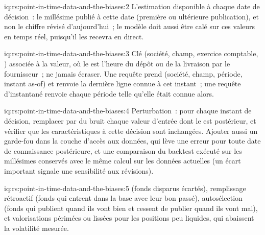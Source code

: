 \begin{solution}{iq:rs:point-in-time-data-and-the-biases:2}
L'estimation disponible à chaque date de décision~: le millésime publié à cette date (première ou ultérieure publication), et non le chiffre révisé
d'aujourd'hui~; le modèle doit aussi être calé sur ces valeurs en temps réel, puisqu'il les recevra en direct.
\end{solution}

\begin{solution}{iq:rs:point-in-time-data-and-the-biases:3}
Clé (société, champ, exercice comptable, ) associée à la valeur, où le  est l'heure du dépôt ou de la livraison par le fournisseur~;
ne jamais écraser. Une requête prend (société, champ, période, instant as-of) et renvoie la dernière ligne connue à cet instant~; une requête
d'instantané renvoie chaque période telle qu'elle était connue alors.
\end{solution}

\begin{solution}{iq:rs:point-in-time-data-and-the-biases:4}
Perturbation~: pour chaque instant de décision, remplacer par du bruit chaque valeur d'entrée dont le  est postérieur, et vérifier que les
caractéristiques à cette décision sont inchangées. Ajouter aussi un garde-fou dans la couche d'accès aux données, qui lève une erreur pour toute date de connaissance postérieure, et
une comparaison du backtest exécuté sur les millésimes conservés avec le même calcul sur les données actuelles (un écart important signale une sensibilité aux
révisions).
\end{solution}

\begin{solution}{iq:rs:point-in-time-data-and-the-biases:5}
 (fonds disparus écartés), remplissage rétroactif (fonds qui entrent dans la base avec leur bon passé), autosélection (fonds qui publient quand ils vont bien
et cessent de publier quand ils vont mal), et valorisations périmées ou lissées pour les positions peu liquides, qui abaissent la volatilité mesurée.
\end{solution}

